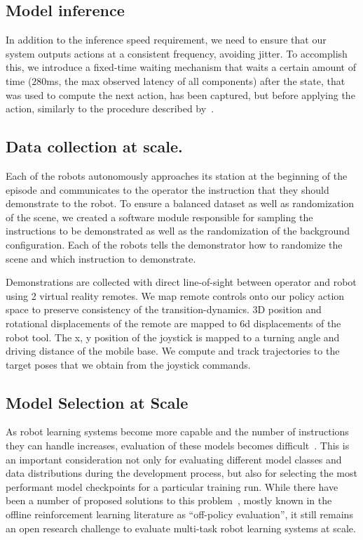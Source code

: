 \documentclass{article} %
\begin{document}
\subsection{Model inference}
\label{sec:app_inference}
In addition to the inference speed requirement, we need to ensure that our system outputs actions at a consistent frequency, avoiding jitter. To accomplish this, we introduce a fixed-time waiting mechanism that waits a certain amount of time ($280$ms, the max observed latency of all components) after the state, that was used to compute the next action, has been captured, but before applying the action, similarly to the procedure described by~\citet{xiao2020thinking}.


\subsection{Data collection at scale.}
\label{sec:app_collection}

Each of the robots autonomously approaches its station at the beginning of the episode and communicates to the operator the instruction that they should demonstrate to the robot. 
To ensure a balanced dataset as well as randomization of the scene, we created a software module responsible for sampling the instructions to be demonstrated as well as the randomization of the background configuration. 
Each of the robots tells the demonstrator how to randomize the scene and which instruction to demonstrate.

Demonstrations are collected with direct line-of-sight between operator and robot using 2 virtual reality remotes. We map remote controls onto our policy action space to preserve consistency of the transition-dynamics. 3D position and rotational displacements of the remote are mapped to 6d displacements of the robot tool. The x, y position of the joystick is mapped to a turning angle and driving distance of the mobile base. We compute and track trajectories to the target poses that we obtain from the joystick commands.


\subsection{Model Selection at Scale}
\label{sec:app_model_selection}
As robot learning systems become more capable and the number of instructions they can handle increases, evaluation of these models becomes difficult~\citep{kalashnikov2021mt,jang2022bc}.
This is an important consideration not only for evaluating different model classes and data distributions during the development process, but also for selecting the most performant model checkpoints for a particular training run.
While there have been a number of proposed solutions to this problem~\citep{dudik2011doubly, irpan2019off, hanna2017bootstrapping}, mostly known in the offline reinforcement learning literature as ``off-policy evaluation'', it still remains an open research challenge to evaluate multi-task robot learning systems at scale.
\end{document}

